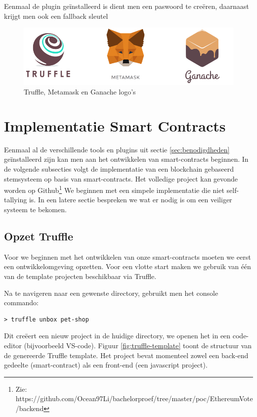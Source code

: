 	Eenmaal de plugin geïnstalleerd is dient men een paswoord te creëren, daarnaast krijgt men ook een fallback sleutel
	
	\begin{figure}
		\includegraphics[width=\linewidth]{img/metamask-truffle-ganache.png}
		\caption{Truffle, Metamask en Ganache logo's}
		\label{fig:metamask-truffle-ganache}
	\end{figure}
	\newpage
\section{Implementatie Smart Contracts}
	Eenmaal al de verschillende tools en plugins uit sectie \ref{sec:benodigdheden} geïnstalleerd zijn kan men aan het ontwikkelen van smart-contracts beginnen. In de volgende subsecties volgt de implementatie van een blockchain gebaseerd stemsysteem op basis van smart-contracts. Het volledige project kan gevonde worden op Github\footnote{Zie: https://github.com/Ocean97Li/bachelorproef/tree/master/poc/EthereumVote/backend} We beginnen met een simpele implementatie die niet self-tallying is. In een latere sectie bespreken we wat er nodig is om een veiliger systeem te bekomen.
	\subsection{Opzet Truffle}
	Voor we beginnen met het ontwikkelen van onze smart-contracts moeten we eerst een ontwikkelomgeving opzetten. Voor een vlotte start maken we gebruik van één van de template projecten beschikbaar via Truffle. 
	
	Na te navigeren naar een gewenste directory, gebruikt men het console commando: 
	 \lstset{language=bash}
	\begin{lstlisting}[numbers=none]
	> truffle unbox pet-shop
	\end{lstlisting}
	
	Dit creëert een nieuw project in de huidige directory, we openen het in een code-editor (bijvoorbeeld VS-code). Figuur \ref{fig:truffle-template} toont de structuur van de genereerde Truffle template. Het project bevat momenteel zowel een back-end gedeelte (smart-contract) als een front-end (een javascript project). 
	
